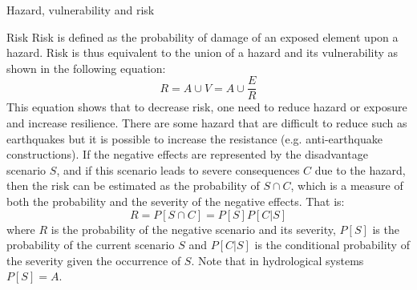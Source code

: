 \documentclass[8pt]{beamer}
\renewcommand{\emph}[1]{\textcolor{myorange}{#1}}
\begin{document}
\begin{frame}{Hazard, vulnerability and risk}
    \begin{block}{Risk}
        \alert{Risk} is defined as the \emph{probability of damage} of an \emph{exposed element} upon a \emph{hazard}. \emph{Risk} is thus equivalent to the union of a hazard and its vulnerability as shown in the following equation:
        \[ 
            R = A\cup V = A \cup \frac{E}{R}
        \]
        This equation shows that to \emph{decrease risk}, one need to \emph{reduce hazard} or \emph{exposure} and \emph{increase resilience}.  There are some hazard that are difficult to reduce such as earthquakes but it is possible to increase the resistance (e.g. anti-earthquake constructions). If the \emph{negative effects} are represented by the \alert{disadvantage scenario $S$}, and if this scenario leads to \alert{severe consequences $C$} due to the hazard, then the \emph{risk} can be estimated as the \emph{probability of $S\cap C$}, which is a measure of both the \emph{probability} and the \emph{severity} of the \emph{negative effects}. That is:
        \[
            R = P[S\cap C] = P[S] P[C|S] 
        \]
        where \emph{$R$ is the probability of the negative scenario and its severity}, \emph{$P[S]$ is the probability of the current scenario $S$} and \emph{$P[C|S]$ is the conditional probability of the severity given the occurrence of $S$}. Note that in hydrological systems $P[S] = A$. 
    \end{block}

\end{frame}
\end{document}
